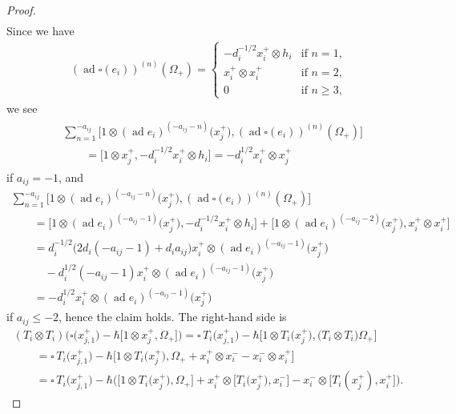 \documentclass[10pt,a4paper]{amsart}
\theoremstyle{definition}
\numberwithin{equation}{section}
\DeclareMathOperator{\ad}{ad}
\begin{document}
\begin{proof}
\begin{gather*}
\end{gather*}
Since we have
\begin{gather*}
(\ad \square(e_i))^{(n)}(\Omega_+) = \begin{cases}
-d_i^{-1/2} x_i^+ \otimes h_i & \text{if $n=1$,}\\
x_i^+ \otimes x_i^+ & \text{if $n=2$,}\\
0& \text{if $n \geq 3$,}
\end{cases}
\end{gather*}
we see
\begin{gather*}
\begin{split}&
\sum_{n=1}^{-a_{ij}} \big[1 \otimes (\ad e_i)^{(-a_{ij}-n)}\big(x_j^+\big),(\ad \square(e_i))^{(n)}(\Omega_+)\big] \\
& \qquad{} = \big[1 \otimes x_j^+, -d_i^{-1/2}x_i^+ \otimes h_i\big] = - d_i^{1/2} x_i^+ \otimes x_j^+\end{split}
\end{gather*}
if $a_{ij}=-1$, and
\begin{gather*}
\sum_{n=1}^{-a_{ij}} \big[1 \otimes (\ad e_i)^{(-a_{ij}-n)}\big(x_j^+\big),(\ad \square(e_i))^{(n)}(\Omega_+)\big] \\
\qquad{} = \big[1 \otimes (\ad e_i)^{(-a_{ij}-1)}\big(x_j^+\big), -d_i^{-1/2}x_i^+ \otimes h_i\big] + \big[1 \otimes (\ad e_i)^{(-a_{ij}-2)}\big(x_j^+\big),x_i^+ \otimes x_i^+\big] \\
\qquad{}= d_i^{-1/2}\big( 2d_i(-a_{ij}-1) + d_ia_{ij} \big) x_i^+ \otimes (\ad e_i)^{(-a_{ij}-1)}\big(x_j^+\big) \\
\qquad\quad{}- d_i^{1/2} ( -a_{ij}-1 ) x_i^+ \otimes (\ad e_i)^{(-a_{ij}-1)}\big(x_j^+\big) \\
\qquad {}= - d_i^{1/2} x_i^+ \otimes (\ad e_i)^{(-a_{ij}-1)}\big(x_j^+\big)
\end{gather*}
if $a_{ij} \leq -2$, hence the claim holds. The right-hand side is
\begin{gather*}
(T_i \otimes T_i)\big(\square\big(x_{j,1}^+\big) - \hbar\big[1 \otimes x_j^+,\Omega_+\big]\big) = \square\,T_i\big(x_{j,1}^+\big) - \hbar \big[1 \otimes T_i\big(x_j^+\big),\big(T_i \otimes T_i\big) \Omega_+\big]\\
\qquad{} = \square\,T_i\big(x_{j,1}^+\big) - \hbar \big[1 \otimes T_i\big(x_j^+\big),\Omega_+ + x_i^+ \otimes x_i^- - x_i^- \otimes x_i^+\big]\\
\qquad{} = \square\,T_i\big(x_{j,1}^+\big) - \hbar \big( \big[1 \otimes T_i\big(x_j^+\big),\Omega_+\big] + x_i^+ \otimes \big[T_i\big(x_j^+\big), x_i^-\big] - x_i^- \otimes \big[T_i(x_j^+),x_i^+\big]\big).

\end{gather*}
\end{proof}
\end{document}
